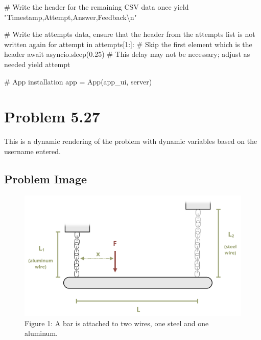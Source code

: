 \documentclass[
  letterpaper,
  DIV=11,
  numbers=noendperiod]{scrreprt}
\newenvironment{Shaded}{\begin{snugshade}}{\end{snugshade}}
\newcommand{\NormalTok}[1]{\textcolor[rgb]{0.00,0.23,0.31}{#1}}
\begin{document}
\begin{Shaded}
\begin{Highlighting}[]
\NormalTok{        \# Write the header for the remaining CSV data once}
\NormalTok{        yield "Timestamp,Attempt,Answer,Feedback\textbackslash{}n"}
        
\NormalTok{        \# Write the attempts data, ensure that the header from the attempts list is not written again}
\NormalTok{        for attempt in attempts[1:]:  \# Skip the first element which is the header}
\NormalTok{            await asyncio.sleep(0.25)  \# This delay may not be necessary; adjust as needed}
\NormalTok{            yield attempt}


\NormalTok{\# App installation}
\NormalTok{app = App(app\_ui, server)}
\end{Highlighting}
\end{Shaded}

\chapter*{Problem 5.27}\label{problem-5.27}


This is a dynamic rendering of the problem with dynamic variables based
on the username entered.

\section*{Problem Image}\label{problem-image-19}


\begin{figure}[H]

{\centering \includegraphics{images/191.png}

}

\caption{Figure 1: A bar is attached to two wires, one steel and one
aluminum.}

\end{figure}%
\end{document}
